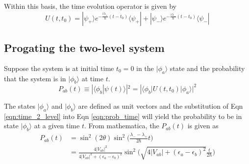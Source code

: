 \documentclass{article}
\begin{document}
Within this basis, the time evolution operator is given by
\begin{equation}
  U(t,t_0) = |\psi_+\rangle e^{-\frac{i\lambda_+}{\hbar}(t-t_0)}\langle\psi_+|
  + |\psi_-\rangle e^{-\frac{i\lambda_-}{\hbar}(t-t_0)}\langle\psi_-|
  \label{eqn:time_2_level}
\end{equation}

\subsection{Progating the two-level system}

Suppose the system is at initial time $t_0=0$ in the $|\phi_a\rangle$ state
and the probability that the system is in $|\phi_b\rangle$ at time $t$.
\begin{equation}
  P_{ab}(t)\equiv |\langle\phi_b|\psi(t)\rangle|^2 = |\langle\phi_b|U(t,t_0)|\phi_a\rangle|^2
  \label{eqn:prob_time}
\end{equation}

The states $|\phi_a\rangle$ and $|\phi_b\rangle$ are defined as unit
vectors and the substitution of Eqn \eqref{eqn:time_2_level} into Eqn \eqref{eqn:prob_time}
will yield the probability to be in state $|\phi_b\rangle$ at a given time $t$.
From mathematica, the $P_{ab}(t)$ is given as
\begin{align}
  P_{ab}(t)&= \sin^2(2\theta)\sin^2\Bigg(\frac{\lambda_- - \lambda_+}{2\hbar}t\Bigg)
  \label{eqn:trig_identity}\\
  &=\frac{4|V_{ab}|^2}{4|V_{ab}|^2+(\epsilon_a-\epsilon_b)^2}
  \sin^2\Bigg(\sqrt{4|V_{ab}|+(\epsilon_a-\epsilon_b)^2}\frac{t}{2\hbar}\Bigg)
  \label{eqn:prob_final}
\end{align}
\end{document}
